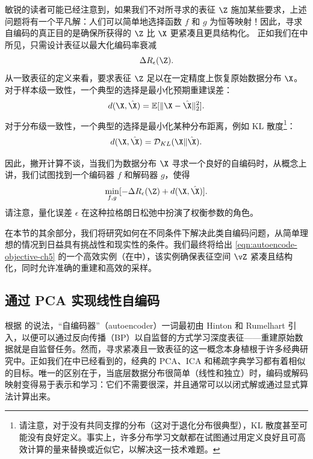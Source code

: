 \documentclass[../../book-main_zh.tex]{subfiles}
\begin{document}
敏锐的读者可能已经注意到，如果我们不对所寻求的表征 $\Z$ 施加某些要求，上述问题将有一个平凡解：人们可以简单地选择函数 $f$ 和 $g$ 为恒等映射！因此，寻求自编码的真正目的是确保所获得的 $\Z$ 比 $\X$ 更紧凑且更具结构化。
正如我们在中所见，只需设计表征以最大化编码率衰减
\begin{equation}
    \Delta R_{\epsilon}(\Z).
\end{equation}%
从一致表征的定义来看，要求表征 $\Z$ 足以在一定精度上恢复原始数据分布 $\X$。对于样本级一致性，一个典型的选择是最小化预期重建误差：
\begin{equation}
    d(\X, \hat \X) = \mathbb{E}[\|\X - \hat\X\|_2^2].
\end{equation}
对于分布级一致性，一个典型的选择是最小化某种分布距离，例如 KL 散度\footnote{请注意，对于没有共同支撑的分布（这对于退化分布很典型），KL 散度甚至可能没有良好定义。事实上，许多分布学习文献都在试图通过用定义良好且可高效计算的量来替换或近似它，以解决这一技术难题。}：
\begin{equation}
    d(\X, \hat \X) = \mathcal{D}_{KL}(\X\|\hat\X).
\end{equation}

因此，撇开计算不谈，当我们为数据分布 $\X$ 寻求一个良好的自编码时，从概念上讲，我们试图找到一个编码器 $f$ 和解码器 $g$，使得
\begin{equation}
    \min_{f, g} [- \Delta R_{\epsilon}(\Z) + d(\X, \hat \X)].
    \label{eqn:autoencode-objective-ch5}
\end{equation}
请注意，量化误差 $\epsilon$ 在这种拉格朗日松弛中扮演了权衡参数的角色。

在本节的其余部分，我们将研究如何在不同条件下解决此类自编码问题，从简单理想的情况到日益具有挑战性和现实性的条件。我们最终将给出 \eqref{eqn:autoencode-objective-ch5} 的一个高效实例（在中），该实例确保表征空间 $\vZ$ 紧凑且结构化，同时允许准确的重建和高效的采样。

\subsection{通过 PCA 实现线性自编码}%

根据 \cite{Baldi2011} 的说法，“自编码器”（autoencoder）一词最初由 Hinton 和 Rumelhart \cite{Rumelhart1986} 引入，以便可以通过反向传播（BP）以自监督的方式学习深度表征——重建原始数据就是自监督任务。然而，寻求紧凑且一致表征的这一概念本身植根于许多经典研究中。正如我们在中已经看到的，经典的 PCA、ICA 和稀疏字典学习都有着相似的目标。唯一的区别在于，当底层数据分布很简单（线性和独立）时，编码或解码映射变得易于表示和学习：它们不需要很深，并且通常可以以闭式解或通过显式算法计算出来。
\end{document}
